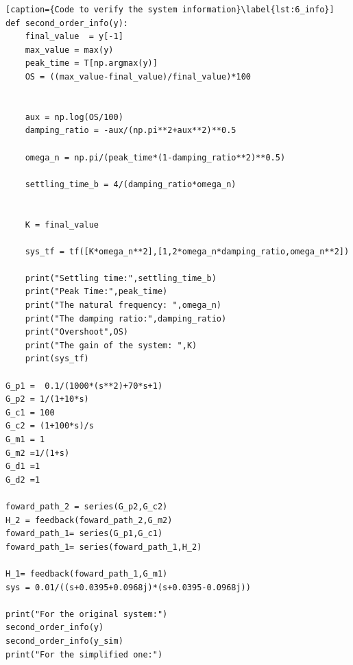 \documentclass[a4paper]{article}
\begin{document}
\begin{lstlisting}[caption={Code to verify the system information}\label{lst:6_info}]
def second_order_info(y):
    final_value  = y[-1]
    max_value = max(y)
    peak_time = T[np.argmax(y)]
    OS = ((max_value-final_value)/final_value)*100


    aux = np.log(OS/100)
    damping_ratio = -aux/(np.pi**2+aux**2)**0.5

    omega_n = np.pi/(peak_time*(1-damping_ratio**2)**0.5)

    settling_time_b = 4/(damping_ratio*omega_n)


    K = final_value

    sys_tf = tf([K*omega_n**2],[1,2*omega_n*damping_ratio,omega_n**2])
    
    print("Settling time:",settling_time_b)
    print("Peak Time:",peak_time)
    print("The natural frequency: ",omega_n)
    print("The damping ratio:",damping_ratio)
    print("Overshoot",OS)
    print("The gain of the system: ",K)
    print(sys_tf)
    
G_p1 =  0.1/(1000*(s**2)+70*s+1) 
G_p2 = 1/(1+10*s) 
G_c1 = 100
G_c2 = (1+100*s)/s
G_m1 = 1
G_m2 =1/(1+s)
G_d1 =1
G_d2 =1

foward_path_2 = series(G_p2,G_c2)
H_2 = feedback(foward_path_2,G_m2)
foward_path_1= series(G_p1,G_c1)
foward_path_1= series(foward_path_1,H_2)

H_1= feedback(foward_path_1,G_m1)
sys = 0.01/((s+0.0395+0.0968j)*(s+0.0395-0.0968j))

print("For the original system:")
second_order_info(y)
second_order_info(y_sim)
print("For the simplified one:")
\end{lstlisting}
\end{document}
